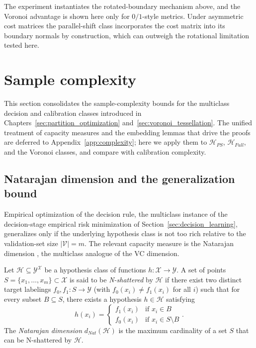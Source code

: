 The experiment instantiates the rotated-boundary mechanism above, and the Voronoi advantage is shown here only for $0/1$-style metrics. Under asymmetric cost matrices the parallel-shift class incorporates the cost matrix into its boundary normals by construction, which can outweigh the rotational limitation tested here.

\section{Sample complexity}\label{sec:multiclass_sample_complexity}

This section consolidates the sample-complexity bounds for the multiclass decision and calibration classes introduced in Chapters~\ref{sec:partition_optimization} and~\ref{sec:voronoi_tessellation}. The unified treatment of capacity measures and the embedding lemmas that drive the proofs are deferred to Appendix~\ref{app:complexity}; here we apply them to $\mathcal{H}_{PS}$, $\mathcal{H}_{Full}$, and the Voronoi classes, and compare with calibration complexity.

\subsection{Natarajan dimension and the generalization bound}

Empirical optimization of the decision rule, the multiclass instance of the decision-stage empirical risk minimization of Section~\ref{sec:decision_learning}, generalizes only if the underlying hypothesis class is not too rich relative to the validation-set size $|\mathcal{V}| = m$. The relevant capacity measure is the Natarajan dimension \citep{natarajan1989learning}, the multiclass analogue of the VC dimension.

\begin{definition}\label{def:natarajan_dimension}
    Let $\mathcal{H} \subseteq \mathcal{Y}^{\mathcal{X}}$ be a hypothesis class of functions $h: \mathcal{X} \to \mathcal{Y}$. A set of points $S = \{x_1, \dots, x_m\} \subset \mathcal{X}$ is said to be \emph{N-shattered} by $\mathcal{H}$ if there exist two distinct target labelings $f_0, f_1: S \to \mathcal{Y}$ (with $f_0(x_i) \neq f_1(x_i)$ for all $i$) such that for every subset $B \subseteq S$, there exists a hypothesis $h \in \mathcal{H}$ satisfying
    \begin{equation}
        h(x_i) = \begin{cases}
            f_1(x_i) & \text{if } x_i \in B \\
            f_0(x_i) & \text{if } x_i \in S \setminus B
        \end{cases}.
    \end{equation}
    The \emph{Natarajan dimension} $d_{Nat}(\mathcal{H})$ is the maximum cardinality of a set $S$ that can be N-shattered by $\mathcal{H}$.
\end{definition}


